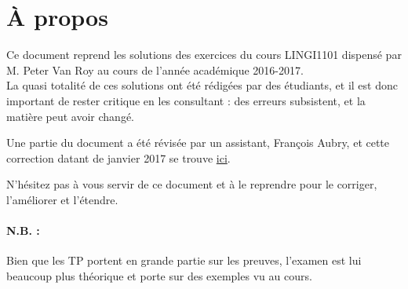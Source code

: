 \section*{À propos}
Ce document reprend les solutions des exercices du cours LINGI1101 dispensé par M. Peter Van Roy au cours de l'année académique 2016-2017.\\
La quasi totalité de ces solutions ont été rédigées par des étudiants, et il est donc important de rester critique en les consultant : des erreurs subsistent, et la matière peut avoir changé.

Une partie du document a été révisée par un assistant, François Aubry, et cette correction datant de janvier 2017 se trouve \href{https://github.com/Gp2mv3/Syntheses/tree/master/src/q5/logique-INGI1101/exercises/Other}{ici}.

\vspace{2ex}
N'hésitez pas à vous servir de ce document et à le reprendre pour le corriger, l'améliorer et l'étendre.

\paragraph{\large{N.B. :}} Bien que les TP portent en grande partie sur les preuves, l'examen est lui beaucoup plus théorique et porte sur des exemples vu au cours.